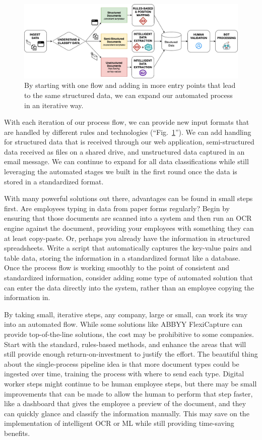 \documentclass[conference, draftcls]{IEEEtran}
\begin{document}
\begin{figure}[ht]
\centerline{\includegraphics[width=\columnwidth]{USE CASE - 4 - ALL.png}}
\caption{By starting with one flow and adding in more entry points that lead to the same structured data, we can expand our automated process in an iterative way.}
\label{figUseCase4}
\end{figure}

With each iteration of our process flow, we can provide new input formats that are handled by different rules and technologies (``Fig.~\ref{figUseCase4}''). We can add handling for structured data that is received through our web application, semi-structured data received as files on a shared drive, and unstructured data captured in an email message. We can continue to expand for all data classifications while still leveraging the automated stages we built in the first round once the data is stored in a standardized format.

With many powerful solutions out there, advantages can be found in small steps first. Are employees typing in data from paper forms regularly? Begin by ensuring that those documents are scanned into a system and then run an OCR engine against the document, providing your employees with something they can at least copy-paste. Or, perhaps you already have the information in structured spreadsheets. Write a script that automatically captures the key-value pairs and table data, storing the information in a standardized format like a database. Once the process flow is working smoothly to the point of consistent and standardized information, consider adding some type of automated solution that can enter the data directly into the system, rather than an employee copying the information in.

By taking small, iterative steps, any company, large or small, can work its way into an automated flow. While some solutions like ABBYY FlexiCapture can provide top-of-the-line solutions, the cost may be prohibitive to some companies. Start with the standard, rules-based methods, and enhance the areas that will still provide enough return-on-investment to justify the effort. The beautiful thing about the single-process pipeline idea is that more document types could be ingested over time, training the process with where to send each type. Digital worker steps might continue to be human employee steps, but there may be small improvements that can be made to allow the human to perform that step faster, like a dashboard that gives the employee a preview of the document, and they can quickly glance and classify the information manually. This may save on the implementation of intelligent OCR or ML while still providing time-saving benefits.
\end{document}
